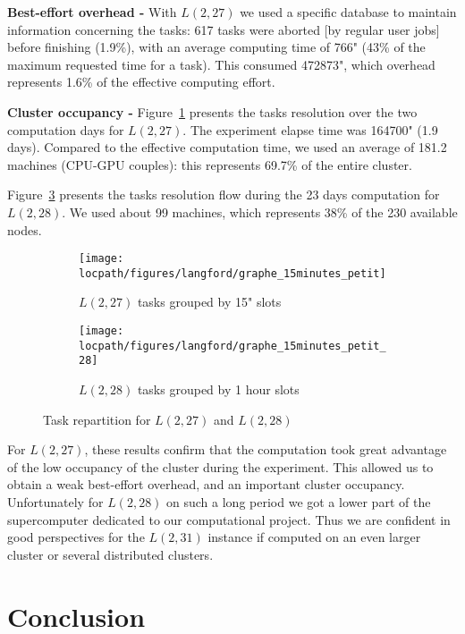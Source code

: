 \textbf{Best-effort overhead -} 
With $L(2,27)$ we used a specific database to maintain information concerning the tasks: 617 tasks were aborted [by regular user jobs] before finishing (1.9\%), with an average computing time of 766" (43\% of the maximum requested time for a task). This consumed 472873", which overhead represents 1.6\% of the effective computing effort.

\textbf{Cluster occupancy -}
Figure~\ref{fig:graphe_15minutes_27} presents the tasks resolution over the two computation days for $L(2,27)$.
The experiment elapse time was 164700" (1.9 days). Compared to the effective computation time, we used an average of 181.2 machines (CPU-GPU couples): this represents 69.7\% of the entire cluster.
 
Figure~\ref{fig:graphe_15minutes_28} presents the tasks resolution flow during the 23 days computation for $L(2,28)$. We used about 99 machines, which represents 38\% of the 230 available nodes.

\begin{figure}[t!]
\begin{subfigure}[b]{0.5\linewidth}
\centering
\texttt{[image: \\locpath/figures/langford/graphe\_15minutes\_petit]}
\caption{$L(2,27)$ tasks grouped by 15" slots}
\label{fig:graphe_15minutes_27}
\end{subfigure}
\begin{subfigure}[b]{0.5\linewidth}
\centering
\texttt{[image: \\locpath/figures/langford/graphe\_15minutes\_petit\_28]}
\caption{$L(2,28)$ tasks grouped by 1 hour slots}
\label{fig:graphe_15minutes_28}
\end{subfigure}
\caption{Task repartition for $L(2,27)$ and $L(2,28)$ }
\end{figure}

For $L(2,27)$, these results confirm that the computation took great advantage of the low occupancy of the cluster during the experiment. 
This allowed us to obtain a weak best-effort overhead, and an important cluster occupancy. 
Unfortunately for $L(2,28)$ on such a long period we got a lower part of the supercomputer dedicated to our computational project.
Thus we are confident in good perspectives for the $L(2,31)$ instance if computed on an even larger cluster or several distributed clusters. 

\section{Conclusion}

